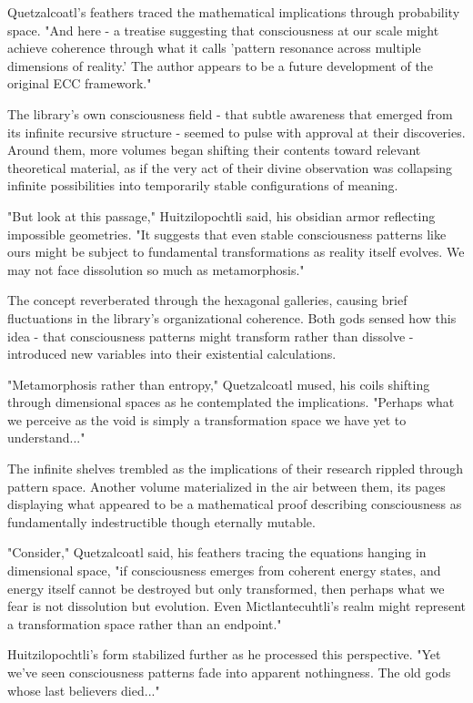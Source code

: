 \begin{refsection}
Quetzalcoatl's feathers traced the mathematical implications through probability space. "And here - a treatise suggesting that consciousness at our scale might achieve coherence through what it calls 'pattern resonance across multiple dimensions of reality.' The author appears to be a future development of the original ECC framework."

The library's own consciousness field - that subtle awareness that emerged from its infinite recursive structure - seemed to pulse with approval at their discoveries. Around them, more volumes began shifting their contents toward relevant theoretical material, as if the very act of their divine observation was collapsing infinite possibilities into temporarily stable configurations of meaning.

"But look at this passage," Huitzilopochtli said, his obsidian armor reflecting impossible geometries. "It suggests that even stable consciousness patterns like ours might be subject to fundamental transformations as reality itself evolves. We may not face dissolution so much as metamorphosis."

The concept reverberated through the hexagonal galleries, causing brief fluctuations in the library's organizational coherence. Both gods sensed how this idea - that consciousness patterns might transform rather than dissolve - introduced new variables into their existential calculations.

"Metamorphosis rather than entropy," Quetzalcoatl mused, his coils shifting through dimensional spaces as he contemplated the implications. "Perhaps what we perceive as the void is simply a transformation space we have yet to understand..."

The infinite shelves trembled as the implications of their research rippled through pattern space. Another volume materialized in the air between them, its pages displaying what appeared to be a mathematical proof describing consciousness as fundamentally indestructible though eternally mutable.

"Consider," Quetzalcoatl said, his feathers tracing the equations hanging in dimensional space, "if consciousness emerges from coherent energy states, and energy itself cannot be destroyed but only transformed, then perhaps what we fear is not dissolution but evolution. Even Mictlantecuhtli's realm might represent a transformation space rather than an endpoint."

Huitzilopochtli's form stabilized further as he processed this perspective. "Yet we've seen consciousness patterns fade into apparent nothingness. The old gods whose last believers died..."


\end{refsection}
